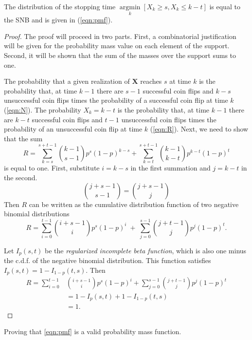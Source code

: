 \documentclass[12pt]{article}         %
\DeclareMathOperator*{\argmin}{argmin}
\newcommand*{\argminl}{\argmin\limits}
\begin{document}
\begin{prop}
The distribution of the stopping time $\argminl_k [X_k \geq s, X_k \leq k-t]$ 
is equal to the SNB and is given in (\ref{eqn:pmf}). 
\end{prop}
\begin{proof}
The proof will proceed in two parts. First, a combinatorial justification will be given for the probability mass value on each element of the support. Second, it will be shown that the sum of the masses over the support sums to one.

The probability that a given realization of $\mathbf{X}$ reaches $s$ at 
time $k$ is  the probability that, at time $k-1$ there are $s-1$ successful 
coin flips and $k-s$ unsuccessful coin flips times the probability of a 
successful coin flip at time $k$ (\ref{eqn:N}). The probability $X_k = k-t$ 
is the probability that, at time $k-1$ there are $k-t$ successful coin flips 
and $t-1$ unsuccessful coin flips times the probability of an unsuccessful 
coin flip at time $k$ (\ref{eqn:R}).  Next, we need to show that the sum
\begin{equation} \label{eqn:sum_proof}
R = \sum_{k=s}^{s+t-1} {k-1 \choose s-1} p^s (1-p)^{k-s} + \sum_{k=t}^{s+t-1} {k-1 \choose k-t} p^{k-t} (1-p)^t
\end{equation}
is equal to one.
First, substitute $i=k-s$ in the first summation and
$j=k-t$ in the second. 
\begin{equation*}
{j+s-1 \choose s-1} = {j+s-1 \choose j}
\end{equation*}
Then %
$R$ can be written
as the cumulative distribution function of two 
negative binomial distributions
\begin{equation} \label{eqn:transformed_sum}
R = \sum_{i=0}^{t-1} {i+s-1 \choose i} p^s (1-p)^i \; + \;
\sum_{j=0}^{s-1} {j+t-1 \choose j} p^j (1-p)^t.
\end{equation}

Let $I_p(s, t)$ be the {\em regularized incomplete beta function}, which is 
also one minus the c.d.f. of the negative binomial distribution. This
function satisfies $I_p(s, t) = 1-I_{1-p}(t, s)$.  Then 
\begin{align*}
R = \sum_{i=0}^{t-1} &{i+s-1 \choose i} p^s (1-p)^i +
\sum_{j=0}^{s-1}  {j+t-1 \choose j} p^j  (1-p)^t \\
   &= 1-I_p(s, t) + 1 - I_{1-p}(t, s) \\
   &= 1. 
\end{align*}
\end{proof}
Proving that \ref{eqn:pmf} is a valid probability mass function.
\end{document}
